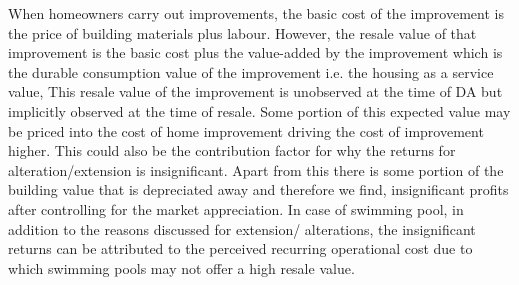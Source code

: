 \documentclass[AEJ,reqno, draftmode]{AEA} %
\begin{document}

When homeowners carry out improvements, the basic cost of the improvement is the price of building materials plus labour. However, the resale value of that improvement is the basic cost plus the value-added by the improvement which is the durable consumption value of the improvement i.e. the housing as a service value, This resale value of the improvement is unobserved at the time of DA but implicitly observed at the time of resale. Some portion of this expected value may be priced into the cost of home improvement driving the cost of improvement higher. This could also be the contribution factor for why the returns for alteration/extension is insignificant. Apart from this there is some portion of the building value that is depreciated away and therefore we find, insignificant profits after controlling for the market appreciation. In case of swimming pool, in addition to the reasons discussed for extension/ alterations, the insignificant returns can be attributed to the perceived recurring operational cost due to which swimming pools may not offer a high resale value.
\end{document}
